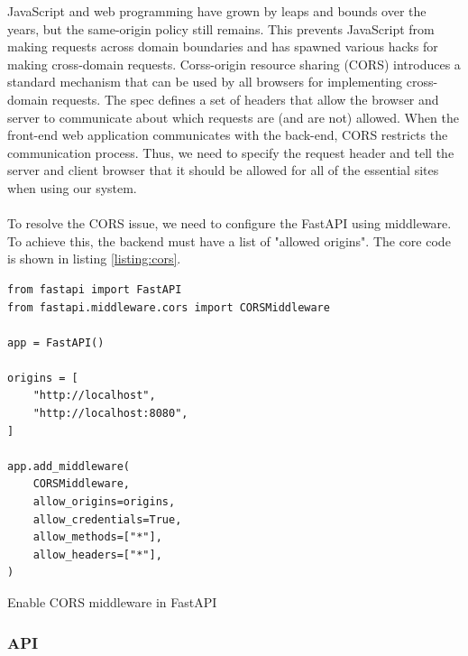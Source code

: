 \documentclass{article}
\begin{document}
JavaScript and web programming have grown by leaps and bounds over the years, but the same-origin policy still remains. This prevents JavaScript from making requests across domain boundaries and has spawned various hacks for making cross-domain requests. Corss-origin resource sharing (CORS)\cite{cors} introduces a standard mechanism that can be used by all browsers for implementing cross-domain requests. The spec defines a set of headers that allow the browser and server to communicate about which requests are (and are not) allowed. When the front-end web application communicates with the back-end, CORS restricts the communication process. Thus, we need to specify the request header and tell the server and client browser that it should be allowed for all of the essential sites when using our system.
\\\\
To resolve the CORS issue, we need to configure the FastAPI using middleware. To achieve this, the backend must have a list of "allowed origins". The core code is shown in listing \ref{listing:cors}.
\begin{listing}[!htp]
\begin{verbatim}
from fastapi import FastAPI
from fastapi.middleware.cors import CORSMiddleware

app = FastAPI()

origins = [
    "http://localhost",
    "http://localhost:8080",
]

app.add_middleware(
    CORSMiddleware,
    allow_origins=origins,
    allow_credentials=True,
    allow_methods=["*"],
    allow_headers=["*"],
)
\end{verbatim}
\caption{Enable CORS middleware in FastAPI}
\label{listing:cors}
\end{listing}

\subsubsection{API}
\end{document}
